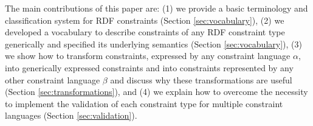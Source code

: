 \documentclass[a4paper,fontsize=11pt]{scrartcl}
\newcommand{\ms}[1]{\texttt{#1}}
\begin{document}
The main contributions of this paper are:
(1) we provide a basic terminology and classification system for RDF constraints (Section \ref{sec:vocabulary}),
(2) we developed a vocabulary to describe constraints of any RDF constraint type generically and specified its underlying semantics (Section \ref{sec:vocabulary}),
(3) we show how to transform constraints, expressed by any constraint language \ms{$\alpha$}, into generically expressed constraints and into constraints represented by any other constraint language \ms{$\beta$} and discuss why these transformations are useful (Section \ref{sec:transformations}), and
(4) we explain how to overcome the necessity to implement the validation of each constraint type for multiple constraint languages (Section \ref{sec:validation}).


\end{document}
